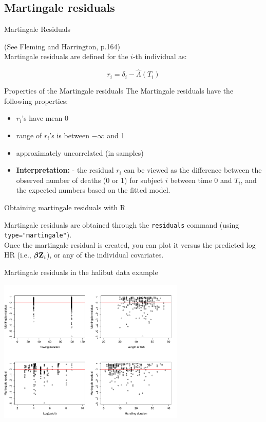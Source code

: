 \documentclass[envcountsect, 10pt, portrait, palatino]{beamer}
\newcommand{\bfbeta}{{\mbox{\boldmath$\beta$}}}
\newcommand{\bfZ}{{\mbox{{\bf Z}}}}
\begin{document}
\subsection{Martingale residuals}
\begin{frame}{Martingale Residuals}

(See Fleming and Harrington, p.164)
\\[2ex]
Martingale residuals are defined for the $i$-th individual as:

\[ r_i = \delta_i - \hat{\Lambda}(T_i) \]
\end{frame}
\begin{frame}{Properties of the Martingale residuals}
The Martingale residuals have the following properties:
\begin{itemize}
\item $r_i$'s have mean 0
\item range of $r_i$'s is between $-\infty$ and 1
\item approximately uncorrelated (in  samples)
\item {\bf Interpretation:} - the residual $r_i$ can be viewed
as the difference between the observed number of deaths (0 or 1)
for subject $i$ between time 0 and $T_i$, and the expected numbers
based on the fitted model.
\end{itemize}
\end{frame}
\begin{frame}[fragile]{Obtaining martingale residuals with R}

Martingale residuals are obtained through the {\tt residuals} command (using {\tt type="martingale"}).
\\[2ex]
Once the martingale residual is created, you can plot it versus the
predicted log HR (i.e., $\bfbeta \bfZ_i$), or any of the individual
covariates.
\end{frame}
\begin{frame}{Martingale residuals in the halibut data example}
\centerline{\includegraphics[width=3.5in]{mart_res.pdf}}
\end{frame}
\end{document}
